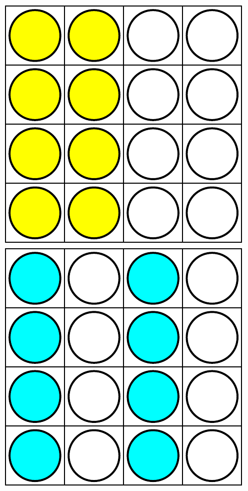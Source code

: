 \documentclass{../../../zirkelblatt}
\begin{document}
\begin{center}
 \includegraphics[scale=0.4]{zerlegung1}\hspace*{3mm}
 \includegraphics[scale=0.4]{zerlegung2}\hspace*{3mm}

\end{center}
\end{document}
